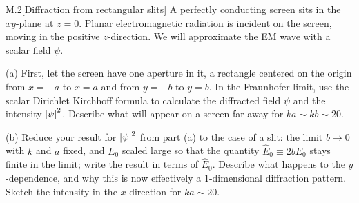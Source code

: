 \documentclass[12pt]{article}
\begin{document}
\newpage
\begin{problem}{M.2}[Diffraction from rectangular slits]
A perfectly conducting screen sits in the $xy$-plane at $z=0$. Planar
electromagnetic radiation is incident on the screen, moving in the positive
$z$-direction. We will approximate the EM wave with a scalar field $\psi$.

(a) First, let the screen have one aperture in it, a rectangle centered on the
origin from $x=-a$ to $x=a$ and from $y=-b$ to $y=b$. In the Fraunhofer limit,
use the scalar Dirichlet Kirchhoff formula to calculate the diffracted field
$\psi$ and the intensity $\abs{\psi}^2$. Describe what will appear on a screen
far away for $ka\sim kb\sim20$.

(b) Reduce your result for $\abs{\psi}^2$ from part (a) to the case of a slit: 
the limit $b\to0$ with $k$ and $a$ fixed, and $E_0$ scaled large so that the
quantity $\hat{E}_0\equiv 2bE_0$ stays finite in the limit; write the result in
terms of $\hat{E}_0$. Describe what happens to the $y$-dependence, and why this
is now effectively a 1-dimensional diffraction pattern. Sketch the intensity in
the $x$ direction for $ka\sim20$.


\end{problem}
\end{document}
